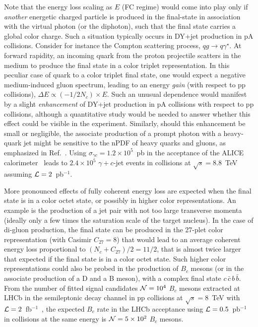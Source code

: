 \documentclass[../report.tex]{subfiles}
\begin{document}
Note that the energy loss scaling as $E$ (FC regime) would come into play only if {\it another} energetic charged particle is produced in the final-state in association with the virtual photon (or the diphoton), such that the final state carries a global color charge. Such a situation typically occurs in DY$+$jet production in pA collisions. Consider for instance the Compton scattering process, $qg \to q\gamma^\star$. At forward rapidity, an incoming quark from the proton projectile scatters in the medium to produce the final state in a color triplet representation. In this peculiar case of quark to a color triplet final state, one would expect a negative medium-induced gluon spectrum, leading to an energy \emph{gain} (with respect to pp collisions), $\Delta E \propto (-1/2N_c)\times E$. Such an unusual dependence would manifest by a slight \emph{enhancement} of DY+jet production in pA collisions with respect to pp collisions, although a quantitative study would be needed to answer whether this effect could be visible in the experiment. Similarly, should this enhancement be small or negligible, the associate production of a prompt photon with a heavy-quark jet might be sensitive to the nPDF of heavy quarks and gluons, as emphasized in Ref.~\cite{Stavreva:2010mw}. Using $\sigma_{\gamma c} = 1.2\times10^5$~pb in the acceptance of the ALICE calorimeter~\cite{Stavreva:2010mw} leads to $2.4\times10^5$ $\gamma+c$-jet events in \pPb collisions at $\sqrt{s}=8.8$~TeV assuming ${\cal L}=2$~pb$^{-1}$.

More pronounced effects of fully coherent energy loss are expected when the final state is in a color octet state, or possibly in higher color representations. An example is the production of a jet pair with not too large transverse momenta (ideally only a few times the saturation scale of the target nucleus). In the case of di-gluon production, the final state can be produced in the 27-plet color representation (with Casimir $C_{27}=8$) that would lead to an average coherent energy loss proportional to $(N_c+C_{27})/2=11/2$, that is almost twice larger that expected if the final state is in a color octet state. Such higher color representations could also be probed in the production of $B_c$ mesons (or in the associate production of a D and a B meson), with a complex final state $c\,\bar{c}\,b\,\bar{b}$. From the number of fitted signal candidates ${\cal N}=10^4$ $B_c$ mesons extracted at LHCb in the semileptonic decay channel in pp collisions at $\sqrt{s}=8$~TeV with ${\cal L}=2$~fb$^{-1}$~\cite{Aaij:2014bva}, the expected $B_c$ rate in the LHCb acceptance using ${\cal L}=0.5$~pb$^{-1}$ in \pPb collisions at the same energy is ${\cal N}=5\times 10^2$ $B_c$ mesons.
\end{document}
